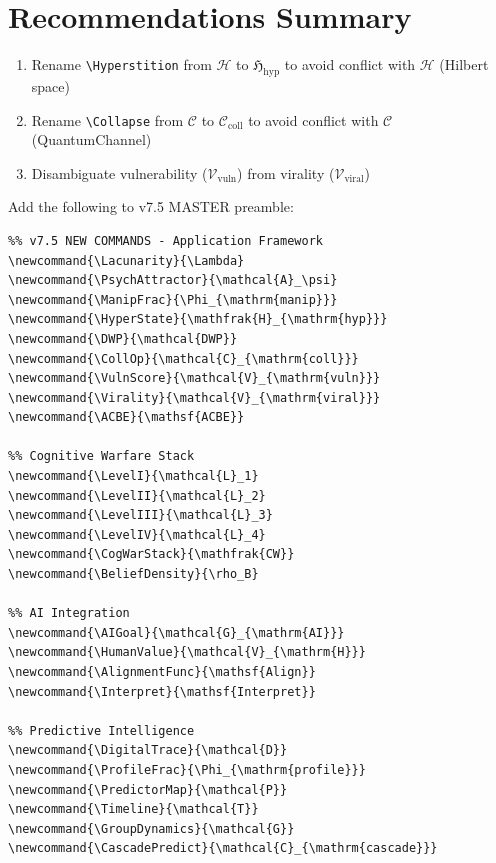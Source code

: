 \documentclass[11pt]{article}
\begin{document}
\section{Recommendations Summary}

\begin{tcolorbox}[colback=yellow!5!white,colframe=yellow!75!black,title=\textbf{Priority 1: Resolve Conflicts (BEFORE v7.5)}]
\begin{enumerate}
    \item Rename \verb|\Hyperstition| from $\mathcal{H}$ to $\mathfrak{H}_{\mathrm{hyp}}$ to avoid conflict with $\mathcal{H}$ (Hilbert space)
    \item Rename \verb|\Collapse| from $\mathcal{C}$ to $\mathcal{C}_{\mathrm{coll}}$ to avoid conflict with $\mathcal{C}$ (QuantumChannel)
    \item Disambiguate vulnerability ($\mathcal{V}_{\mathrm{vuln}}$) from virality ($\mathcal{V}_{\mathrm{viral}}$)
\end{enumerate}
\end{tcolorbox}

\begin{tcolorbox}[colback=green!5!white,colframe=green!75!black,title=\textbf{Priority 2: Add New Canonical Commands to v7.5}]
Add the following to v7.5 MASTER preamble:
\begin{verbatim}
%% v7.5 NEW COMMANDS - Application Framework
\newcommand{\Lacunarity}{\Lambda}
\newcommand{\PsychAttractor}{\mathcal{A}_\psi}
\newcommand{\ManipFrac}{\Phi_{\mathrm{manip}}}
\newcommand{\HyperState}{\mathfrak{H}_{\mathrm{hyp}}}
\newcommand{\DWP}{\mathcal{DWP}}
\newcommand{\CollOp}{\mathcal{C}_{\mathrm{coll}}}
\newcommand{\VulnScore}{\mathcal{V}_{\mathrm{vuln}}}
\newcommand{\Virality}{\mathcal{V}_{\mathrm{viral}}}
\newcommand{\ACBE}{\mathsf{ACBE}}

%% Cognitive Warfare Stack
\newcommand{\LevelI}{\mathcal{L}_1}
\newcommand{\LevelII}{\mathcal{L}_2}
\newcommand{\LevelIII}{\mathcal{L}_3}
\newcommand{\LevelIV}{\mathcal{L}_4}
\newcommand{\CogWarStack}{\mathfrak{CW}}
\newcommand{\BeliefDensity}{\rho_B}

%% AI Integration
\newcommand{\AIGoal}{\mathcal{G}_{\mathrm{AI}}}
\newcommand{\HumanValue}{\mathcal{V}_{\mathrm{H}}}
\newcommand{\AlignmentFunc}{\mathsf{Align}}
\newcommand{\Interpret}{\mathsf{Interpret}}

%% Predictive Intelligence
\newcommand{\DigitalTrace}{\mathcal{D}}
\newcommand{\ProfileFrac}{\Phi_{\mathrm{profile}}}
\newcommand{\PredictorMap}{\mathcal{P}}
\newcommand{\Timeline}{\mathcal{T}}
\newcommand{\GroupDynamics}{\mathcal{G}}
\newcommand{\CascadePredict}{\mathcal{C}_{\mathrm{cascade}}}
\end{verbatim}
\end{tcolorbox}
\end{document}
